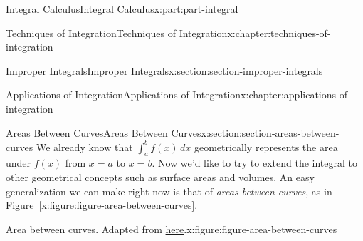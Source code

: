 \documentclass[twoside,10pt,]{book}
\newcommand{\xreffont}{\relax}
\numberwithin{equation}{part}
\begin{document}
\begin{partptx}{Integral Calculus}{}{Integral Calculus}{}{}{x:part:part-integral}
\begin{chapterptx}{Techniques of Integration}{}{Techniques of Integration}{}{}{x:chapter:techniques-of-integration}
\begin{sectionptx}{Improper Integrals}{}{Improper Integrals}{}{}{x:section:section-improper-integrals}
\end{sectionptx}
\end{chapterptx}
%
\typeout{************************************************}
\typeout{************************************************}
%
\begin{chapterptx}{Applications of Integration}{}{Applications of Integration}{}{}{x:chapter:applications-of-integration}
%
%
\typeout{************************************************}
\typeout{************************************************}
%
\begin{sectionptx}{Areas Between Curves}{}{Areas Between Curves}{}{}{x:section:section-areas-between-curves}
We already know that \(\int_{a}^{b}f(x)\,dx\) geometrically represents the area under \(f(x)\) from \(x = a\) to \(x = b\). Now we'd like to try to extend the integral to other geometrical concepts such as surface areas and volumes. An easy generalization we can make right now is that of \emph{areas between curves}, as in \hyperref[x:figure:figure-area-between-curves]{Figure~{\xreffont\ref{x:figure:figure-area-between-curves}}}.%
\begin{figureptx}{Area between curves. Adapted from \href{https://tex.stackexchange.com/questions/164773/graphics-area-between-curves}{here}\protect\footnotemark{}.}{x:figure:figure-area-between-curves}{}%
\begin{image}{0.125}{0.75}{0.125}%
\end{image}
\end{figureptx}
\end{sectionptx}
\end{chapterptx}
\end{partptx}
\end{document}
